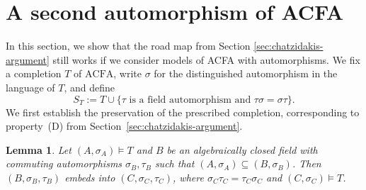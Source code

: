 \documentclass[11pt,a4paper]{amsart}
\newtheorem{lemma}[theorem]{Lemma}
\theoremstyle{definition}
\newcommand{\ACFA}{\mathrm{ACFA}}
\begin{document}
\section{A second automorphism of ACFA}\label{sec:acfa}
In this section, we show that the road map from Section \ref{sec:chatzidakis-argument} still works if we consider models of ACFA with automorphisms. We fix a completion $T$ of $\ACFA$, write $\sigma$ for the distinguished automorphism in the language of $T$, and define
\[
 S_T:=T\cup\{\text{$\tau$ is a field automorphism and $\tau\sigma=\sigma\tau$}\}.
\]
We first establish the preservation of the prescribed completion,
corresponding to property~(D) from
Section~\ref{sec:chatzidakis-argument}.
\begin{lemma}\label{a:lem:acfa}
Let $(A,\sigma_A)\models T$ and $B$ be an algebraically closed field with commuting automorphisms $\sigma_B,\tau_B$ such that $(A,\sigma_A)\subseteq (B,\sigma_B)$. Then $(B,\sigma_B,\tau_B)$ embeds into $(C,\sigma_C,\tau_C)$, where $\sigma_C\tau_C=\tau_C\sigma_C$ and $(C,\sigma_C)\models T$.
\end{lemma}
\end{document}
